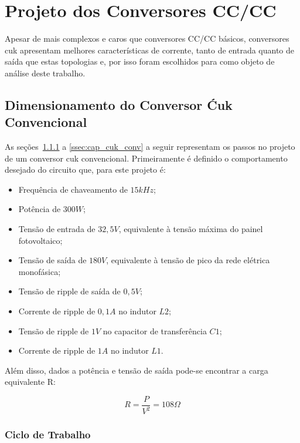 \documentclass[
	12pt,				%
	openany,
	onseside,
	a4paper,			%
	english,			%
	french,				%
	spanish,			%
	brazil,				%
	]{abntex2}
\begin{document}
\section{Projeto dos Conversores CC/CC}

Apesar de mais complexos e caros que conversores CC/CC básicos, conversores cuk apresentam melhores características de corrente, tanto de entrada quanto de saída que estas topologias \cite{JOSEPH_2017_Intervealed_CUK} e, por isso foram escolhidos para como objeto de análise deste trabalho.

\subsection{Dimensionamento do Conversor Ćuk Convencional} \label{ssec:cuk_conv_met}

As seções~\ref{ssec:d_cuk_conv} a \ref{ssec:cap_cuk_conv} a seguir representam os passos no projeto de um conversor cuk convencional. Primeiramente é definido o comportamento desejado do circuito que, para este projeto é:

\begin{itemize}%
	\item Frequência de chaveamento de $15kHz$;
	\item Potência de $300W$;
	\item Tensão de entrada de $32,5V$, equivalente à tensão máxima do painel fotovoltaico;
	\item Tensão de saída de $180V$, equivalente à tensão de pico da rede elétrica monofásica;
	\item Tensão de ripple de saída de $0,5V$;
	\item Corrente de ripple de $0,1A$ no indutor $L2$;
	\item Tensão de ripple de $1V$ no capacitor de transferência $C1$;
	\item Corrente de ripple de $1A$ no indutor $L1$.
\end{itemize}

Além disso, dados a potência e tensão de saída pode-se encontrar a carga equivalente R:

\begin{equation}%
	R = \frac{P}{V^2} = 108 \Omega \label{eq:cuk_load}
\end{equation}

\subsubsection{Ciclo de Trabalho}\label{ssec:d_cuk_conv}
\end{document}
